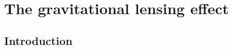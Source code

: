 
\chapter{The gravitational lensing effect}
\lhead[\fancyplain{}{\thepage}]{\fancyplain{}{\rightmark}}
 \thispagestyle{plain}
\setlength{\parindent}{10mm}


\section{Introduction}

%